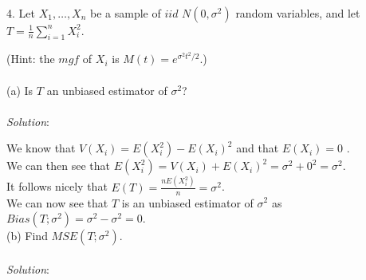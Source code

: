 \documentclass[12pt]{article}
\newcommand{\XB}{\color{black}}
\newcommand{\XBB}{\color{blue}}
\newcommand{\XV}{\color{violet}}
\begin{document}
\XBB\hrulefill\XB \\

4. Let $ X_{1}, \dots, X_{n} $ be a sample of $ iid $ $ N(0, \sigma^{2}) $ random variables, and let $ \displaystyle T = \frac{1}{n} \sum_{i=1}^{n} X_{i}^{2} $. 

(Hint: the $ mgf $ of $ X_{i} $ is $ \displaystyle M(t) = e^{\sigma^{2}t^{2}/2} $.) \\

\XBB\hrulefill\XB 
\vspace{5mm} \\


(a) Is $ T $ an unbiased estimator of $ \sigma^{2} $? \\
\vspace{2.5mm} \\
\textit{Solution}:
\vspace{2.5mm}

\noindent 
We know that $ V(X_{i}) = E(X_{i}^{2}) - E(X_{i})^{2} $ and that $ E(X_{i}) = 0 $ . \\

\noindent
We can then see that $ E(X_{i}^{2}) = V(X_{i}) + E(X_{i})^{2} = \sigma^{2} + 0^{2} = \sigma^{2} $. \\

\noindent
It follows nicely that $ \displaystyle E(T) = \frac{nE(X_{i}^{2})}{n} = \sigma^{2} $. \\

\noindent
We can now see that $ T $ is an unbiased estimator of $ \sigma^{2} $ as $ Bias(T; \sigma^{2}) = \sigma^{2} - \sigma^{2} = 0 $. \\



(b) Find $ MSE(T; \sigma^{2}) $. \\
\vspace{2.5mm} \\
\textit{Solution}:
\vspace{2.5mm}
\end{document}
